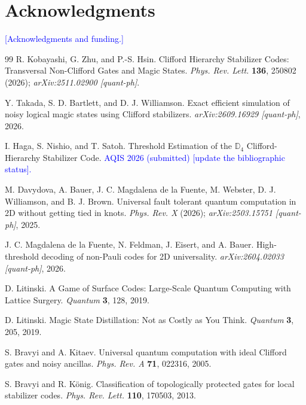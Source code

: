 \documentclass[a4paper]{article}
\newcommand{\blue}[1]{\textcolor{blue}{#1}}
\begin{document}
\section*{Acknowledgments}
\blue{[Acknowledgments and funding.]}

\begin{thebibliography}{99}
R. Kobayashi, G. Zhu, and P.-S. Hsin.
\newblock Clifford Hierarchy Stabilizer Codes: Transversal Non-Clifford Gates and Magic States.
\newblock \textit{Phys. Rev. Lett.} \textbf{136}, 250802 (2026); \textit{arXiv:2511.02900 [quant-ph]}.

Y. Takada, S. D. Bartlett, and D. J. Williamson.
\newblock Exact efficient simulation of noisy logical magic states using Clifford stabilizers.
\newblock \textit{arXiv:2609.16929 [quant-ph]}, 2026.

I. Haga, S. Nishio, and T. Satoh.
\newblock Threshold Estimation of the $\mathbb{D}_4$ Clifford-Hierarchy Stabilizer Code.
\newblock \blue{AQIS 2026 (submitted) [update the bibliographic status].}

M. Davydova, A. Bauer, J. C. Magdalena de la Fuente, M. Webster, D. J. Williamson, and B. J. Brown.
\newblock Universal fault tolerant quantum computation in 2D without getting tied in knots.
\newblock \textit{Phys. Rev. X} (2026); \textit{arXiv:2503.15751 [quant-ph]}, 2025.

J. C. Magdalena de la Fuente, N. Feldman, J. Eisert, and A. Bauer.
\newblock High-threshold decoding of non-Pauli codes for 2D universality.
\newblock \textit{arXiv:2604.02033 [quant-ph]}, 2026.

D. Litinski.
\newblock A Game of Surface Codes: Large-Scale Quantum Computing with Lattice Surgery.
\newblock \textit{Quantum} \textbf{3}, 128, 2019.

D. Litinski.
\newblock Magic State Distillation: Not as Costly as You Think.
\newblock \textit{Quantum} \textbf{3}, 205, 2019.

S. Bravyi and A. Kitaev.
\newblock Universal quantum computation with ideal Clifford gates and noisy ancillas.
\newblock \textit{Phys. Rev. A} \textbf{71}, 022316, 2005.

S. Bravyi and R. K\"onig.
\newblock Classification of topologically protected gates for local stabilizer codes.
\newblock \textit{Phys. Rev. Lett.} \textbf{110}, 170503, 2013.


\end{thebibliography}
\end{document}
